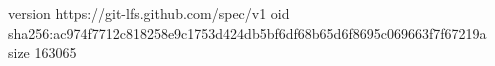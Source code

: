 version https://git-lfs.github.com/spec/v1
oid sha256:ac974f7712c818258e9c1753d424db5bf6df68b65d6f8695c069663f7f67219a
size 163065
